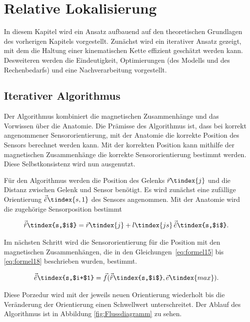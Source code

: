         
\section{Relative Lokalisierung}
In diesem Kapitel wird ein Ansatz aufbauend auf den theoretischen Grundlagen des vorherigen Kapitels vorgestellt. Zunächst wird ein iterativer Ansatz gezeigt, mit dem die Haltung einer kinematischen Kette effizient geschätzt werden kann. Desweiteren werden die Eindeutigkeit, Optimierungen (des Modells und des Rechenbedarfs) und eine Nachverarbeitung vorgestellt. 


\subsection{Iterativer Algorithmus}

    Der Algorithmus kombiniert die magnetischen Zusammenhänge und das Vorwissen über die Anatomie. Die Prämisse des Algorithmus ist, dass bei korrekt angenommener Sensororientierung, mit der Anatomie die korrekte Position des Sensors berechnet werden kann. Mit der korrekten Position kann mithilfe der magnetischen Zusammenhänge die korrekte Sensororientierung bestimmt werden. Diese Selbstkonsistenz wird nun ausgenutzt.

    Für den Algorithmus werden die Position des Gelenks $\vec{r}\tindex{j}$ und die Distanz zwischen Gelenk und Sensor benötigt. Es wird zunächst eine zufällige Orientierung $\vec{\hat{e}}\tindex{s,1}$ des Sensors angenommen. Mit der Anatomie wird die zugehörige Sensorposition bestimmt

    \begin{equation}
        \vec{\hat{r}}\tindex{s,$i$} = \vec{r}\tindex{j} + l\tindex{js} \, \vec{\hat{e}}\tindex{s,$i$} .
        \label{eq:formelIter1}
    \end{equation}
    
    Im nächsten Schritt wird die Sensororientierung für die Position mit den magnetischen Zusammenhängen, die in den Gleichungen \,\ref{eq:formel15} bis \ref{eq:formel18} beschrieben wurden, bestimmt.

    \begin{equation}
        	\vec{\hat{e}}\tindex{s,$i+$1} = \vec{f}(\vec{\hat{r}}\tindex{s,$i$},\vec{e}\tindex{max}).
        \label{eq:formelIter2}
    \end{equation} 
    
    Diese Porzedur wird mit der jeweils neuen Orientierung wiederholt bis die Veränderung der Orientierung einen Schwellwert unterschreitet. Der Ablauf des Algorithmus ist in Abbildung \ref{fig:Flussdiagramm} zu sehen.
    

